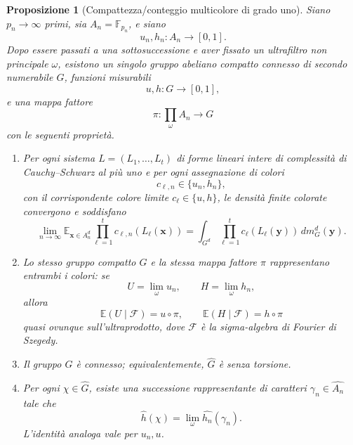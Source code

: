 \documentclass[11pt]{article}
\numberwithin{equation}{section}
\newtheorem{proposition}[theorem]{Proposizione}
\newcommand{\E}{\mathbb E}
\newcommand{\F}{\mathbb F}
\newcommand{\1}{\mathbf 1}
\newcommand{\calF}{\mathcal F}
\begin{document}
\begin{proposition}[Compattezza/conteggio multicolore di grado uno]
\label{prop:multicolour-compactness}
Siano \(p_n\to\infty\) primi, sia \(A_n=\F_{p_n}\), e siano
\[
        u_n,h_n:A_n\to[0,1].
\]
Dopo essere passati a una sottosuccessione e aver fissato un ultrafiltro non principale \(\omega\), esistono un singolo gruppo abeliano compatto connesso di secondo numerabile \(G\), funzioni misurabili
\[
        u,h:G\to[0,1],
\]
e una mappa fattore
\[
        \pi:\prod_\omega A_n\to G
\]
con le seguenti proprietà.

\begin{enumerate}[label=(\alph*)]
\item Per ogni sistema \(L=(L_1,\ldots,L_t)\) di forme lineari intere di complessità di Cauchy--Schwarz al più uno e per ogni assegnazione di colori
\[
        c_{\ell,n}\in\{u_n,h_n\},
\]
con il corrispondente colore limite \(c_\ell\in\{u,h\}\), le densità finite colorate convergono e soddisfano
\[
        \lim_{n\to\infty}
        \E_{\mathbf x\in A_n^d}
        \prod_{\ell=1}^t c_{\ell,n}(L_\ell(\mathbf x))
        =
        \int_{G^d}
        \prod_{\ell=1}^t c_\ell(L_\ell(\mathbf y))\,dm_G^d(\mathbf y).
\]

\item Lo stesso gruppo compatto \(G\) e la stessa mappa fattore \(\pi\) rappresentano entrambi i colori: se
\[
        U=\lim_\omega u_n,
        \qquad
        H=\lim_\omega h_n,
\]
allora
\[
        \E(U\mid\calF)=u\circ\pi,
        \qquad
        \E(H\mid\calF)=h\circ\pi
\]
quasi ovunque sull'ultraprodotto, dove \(\calF\) è la sigma-algebra di Fourier di Szegedy.

\item Il gruppo \(G\) è connesso; equivalentemente, \(\widehat G\) è senza torsione.

\item Per ogni \(\chi\in\widehat G\), esiste una successione rappresentante di caratteri \(\gamma_n\in\widehat{A_n}\) tale che
\[
        \widehat h(\chi)
        =
        \lim_\omega \widehat{h_n}(\gamma_n).
\]
L'identità analoga vale per \(u_n,u\).
\end{enumerate}
\end{proposition}
\end{document}
